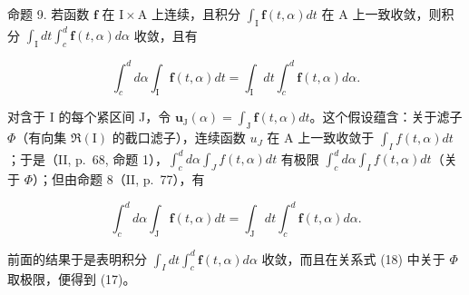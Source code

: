 命题 9. 若函数 \(\mathbf{f}\) 在 \(\mathrm{I} \times \mathrm{A}\) 上连续，且积分 \(\int_{\mathrm{I}} \mathbf{f}(t, \alpha) dt\) 在 \(\mathrm{A}\) 上一致收敛，则积分 \(\int_{\mathrm{I}} dt \int_{c}^{d} \mathbf{f}(t, \alpha) d\alpha\) 收敛，且有

\[
\int_ {c} ^ {d} d \alpha \int_ {\mathrm{I}} \mathbf {f} (t, \alpha) d t = \int_ {\mathrm{I}} d t \int_ {c} ^ {d} \mathbf {f} (t, \alpha) d \alpha .\tag{17}
\]

对含于 I 的每个紧区间 J，令 \(\mathbf{u}_{\mathrm{J}}(\alpha) = \int_{\mathrm{J}} \mathbf{f}(t, \alpha) dt\)。这个假设蕴含：关于滤子 \(\Phi\)（有向集 \(\Re(\mathrm{I})\) 的截口滤子），连续函数 \(u_{J}\) 在 A 上一致收敛于 \(\int_{I} f(t, \alpha) dt\)；于是（II, p.~68, 命题 1），\(\int_{c}^{d} d\alpha \int_{J} f(t, \alpha) dt\) 有极限 \(\int_{c}^{d} d\alpha \int_{I} f(t, \alpha) dt\)（关于 \(\Phi\)）；但由命题 8（II, p.~77），有

\[
\int_ {c} ^ {d} d \alpha \int_ {\mathrm{J}} \mathbf {f} (t, \alpha) d t = \int_ {\mathrm{J}} d t \int_ {c} ^ {d} \mathbf {f} (t, \alpha) d \alpha .\tag{18}
\]

前面的结果于是表明积分 \(\int_{I} dt \int_{c}^{d} \mathbf{f}(t, \alpha) d\alpha\) 收敛，而且在关系式 (18) 中关于 \(\Phi\) 取极限，便得到 (17)。

\setcounter{exercisegroup}{0}
